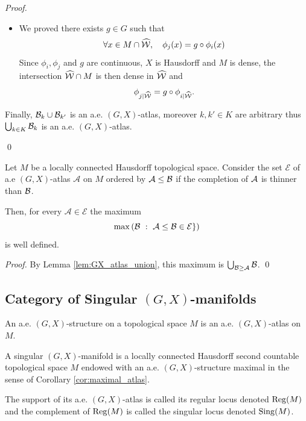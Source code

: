 \begin{proof}
\begin{itemize}
					\item We proved there exists $g\in G$  such that
					$$\forall x\in M\cap \widehat {\mathcal W}, \quad  \phi_j(x)=g\circ \phi_i(x)$$
					Since $\phi_i,\phi_j$ and $g$ are continuous, $X$ is Hausdorff and $M$ is dense, 
					the intersection $\widehat {\mathcal W}\cap M$ is then dense in 
					$\widehat {\mathcal W}$ and
					$$\phi_{j|\widehat{\mathcal W}}=g\circ \phi_{i|\widehat{\mathcal W}}.$$
					\end{itemize}
					Finally, $\mathcal B_k\cup \mathcal B_{k'}$ is an a.e. $(G,X)$-atlas, moreover  $k,k'\in K$ are arbitrary thus $\bigcup_{k\in K} \mathcal B_k$ is an a.e. $(G,X)$-atlas.
					
					\qed\end{proof}
					
					
					\begin{cor} \label{cor:maximal_atlas}
					Let $M$ be a locally connected Hausdorff topological space. 
					Consider the set $\mathcal E$ of  a.e $(G,X)$-atlas $\mathcal A$ on $M$ ordered by $\mathcal A\leq \mathcal B$ if the completion of $\mathcal A$ is thinner than $\mathcal B$.
					
					Then, for every $\mathcal A \in \mathcal E$ the maximum $$ \max\,(\mathcal B ~:~ \mathcal A\leq \mathcal B \in \mathcal E\})$$
					is well defined.
					\end{cor}
                    \begin{proof}
                      By Lemma \ref{lem:GX_atlas_union}, this maximum is  $\bigcup_{\mathcal B\geq \mathcal A}\mathcal B$.
                    \qed\end{proof}					
                    
                    \subsection{Category of Singular $(G,X)$-manifolds}
                    
                    \begin{defi} An a.e. $(G,X)$-structure on a topological space $M$ is an a.e. $(G,X)$-atlas on $M$.                     
                    \end{defi}
                    
					\begin{defi} A singular $(G,X)$-manifold is a locally connected Hausdorff second countable topological space $M$ endowed with an a.e. $(G,X)$-structure maximal in the sense of Corollary \ref{cor:maximal_atlas}.
					
					The support of its a.e. $(G,X)$-atlas is called its regular locus denoted $\mathrm{Reg}(M)$ and the complement of $\mathrm{Reg}(M)$ is called the singular locus denoted $\mathrm{Sing}(M)$.
					\end{defi}
                    
